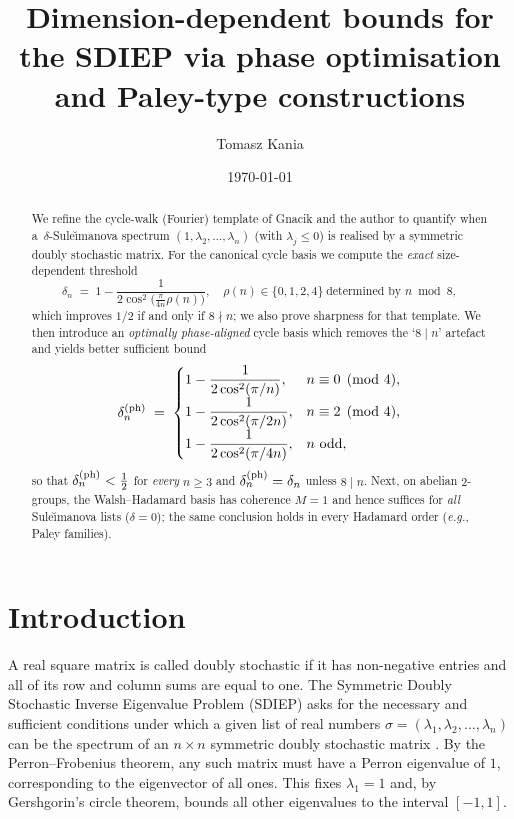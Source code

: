 \documentclass[12pt,fleqn]{amsart}
\title[Dimension-dependent bounds for the SDIEP]{Dimension-dependent bounds for the SDIEP via phase optimisation and Paley-type constructions}
\author{Tomasz Kania}
\date{\today}
\renewcommand{\le}{\leqslant}
\renewcommand{\ge}{\geqslant}
\theoremstyle{remark}
\newcommand{\1}{\mathbf{1}}
\begin{document}
\maketitle

\begin{abstract}
We refine the cycle-walk (Fourier) template of Gnacik and the author to quantify when a~$\delta$-Sule\u{\i}manova spectrum $(1,\lambda_2,\dots,\lambda_n)$ (with $\lambda_j\le 0$) is realised by a symmetric doubly stochastic matrix. For the canonical cycle basis we compute the \emph{exact} size-dependent threshold
\[
\delta_n \;=\; 1-\frac{1}{2\cos^2\!\Big(\frac{\pi}{4n}\rho(n)\Big)},
\quad
\rho(n)\in\{0,1,2,4\}\ \text{determined by } n\bmod 8,
\]
which improves $1/2$ if and only if $8\nmid n$; we also prove sharpness for that template. We then introduce an \emph{optimally phase-aligned} cycle basis which removes the `$8\mid n$' artefact and yields better sufficient bound
\[
\delta_n^{\rm (ph)} \;=\;
\begin{cases}
\displaystyle 1-\dfrac{1}{2\cos^2(\pi/n)},   & n\equiv 0\pmod{4},\\[2mm]
\displaystyle 1-\dfrac{1}{2\cos^2(\pi/2n)},  & n\equiv 2\pmod{4},\\[2mm]
\displaystyle 1-\dfrac{1}{2\cos^2(\pi/4n)},  & n\ \text{odd},
\end{cases}
\]
so that $\delta_n^{\rm (ph)}<\tfrac12$ for \emph{every} $n\ge3$ and $\delta_n^{\rm (ph)}=\delta_n$ unless $8\mid n$. Next, on abelian $2$-groups, the Walsh--Hadamard basis has coherence $M=1$ and hence suffices for \emph{all} Sule\u{\i}manova lists ($\delta=0$); the same conclusion holds in every Hadamard order (\emph{e.g.}, Paley families).
\end{abstract}

\section{Introduction}

A real square matrix is called doubly stochastic if it has non-negative entries and all of its row and column sums are equal to one. The Symmetric Doubly Stochastic Inverse Eigenvalue Problem (SDIEP) asks for the necessary and sufficient conditions under which a given list of real numbers $\sigma = (\lambda_1, \lambda_2, \dots, \lambda_n)$ can be the spectrum of an $n \times n$ symmetric doubly stochastic matrix \cite{GK20}. By the Perron--Frobenius theorem, any such matrix must have a Perron eigenvalue of $1$, corresponding to the eigenvector of all ones. This fixes $\lambda_1=1$ and, by Gershgorin's circle theorem, bounds all other eigenvalues to the interval $[-1, 1]$.\smallskip
\end{document}
